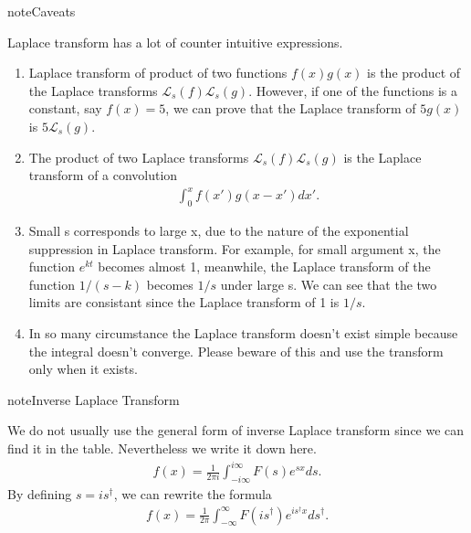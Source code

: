 \documentclass[letterpaper,10pt,english]{sphinxmanual}
\begin{document}
\begin{sphinxadmonition}{note}{Caveats}

Laplace transform has a lot of counter intuitive expressions.
\begin{enumerate}
\item {} 
Laplace transform of product of two functions \(f(x)g(x)\) is  the product of the Laplace transforms \(\mathcal L_s(f)\mathcal L_s(g)\). However, if one of the functions is a constant, say \(f(x)=5\), we can prove that the Laplace transform of \(5g(x)\) is \(5\mathcal L_s(g)\).

\item {} 
The product of two Laplace transforms \(\mathcal L_s(f)\mathcal L_s(g)\) is the Laplace transform of a convolution
\begin{equation*}
\begin{split}\int_0^x f(x') g(x-x') dx'.\end{split}
\end{equation*}
\item {} 
Small s corresponds to large x, due to the nature of the exponential suppression in Laplace transform. For example, for small argument x, the function \(e^{k t}\) becomes almost 1, meanwhile, the Laplace transform of the function \(1/(s - k)\) becomes \(1/s\) under large s. We can see that the two limits are consistant since the Laplace transform of 1 is \(1/s\).

\item {} 
In so many circumstance the Laplace transform doesn’t exist simple because the integral doesn’t converge. Please beware of this and use the transform only when it exists.

\end{enumerate}
\end{sphinxadmonition}

\begin{sphinxadmonition}{note}{Inverse Laplace Transform}

We do not usually use the general form of inverse Laplace transform since we can find it in the table. Nevertheless we write it down here.
\begin{equation*}
\begin{split}f(x) = \frac{1}{2\pi i} \int_{-i\infty}^{i \infty} F(s) e^{sx}ds.\end{split}
\end{equation*}
By defining \(s=i s^\dagger\), we can rewrite the formula
\begin{equation*}
\begin{split}f(x) = \frac{1}{2\pi} \int_{-\infty}^{\infty} F(is^\dagger) e^{is^\dagger x} ds^\dagger .\end{split}
\end{equation*}\end{sphinxadmonition}
\end{document}
